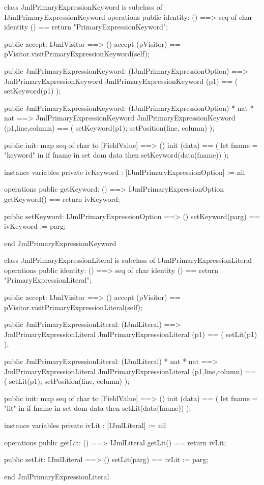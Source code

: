 \begin{vdm_al}
class JmlPrimaryExpressionKeyword is subclass of IJmlPrimaryExpressionKeyword
operations
  public identity: () ==> seq of char
  identity () == return "PrimaryExpressionKeyword";

  public accept: IJmlVisitor ==> ()
  accept (pVisitor) == pVisitor.visitPrimaryExpressionKeyword(self);

  public JmlPrimaryExpressionKeyword:
    (IJmlPrimaryExpressionOption) ==> JmlPrimaryExpressionKeyword
  JmlPrimaryExpressionKeyword (p1) == 
    ( setKeyword(p1) );

  public JmlPrimaryExpressionKeyword:
    (IJmlPrimaryExpressionOption) *
    nat *
    nat ==> JmlPrimaryExpressionKeyword
  JmlPrimaryExpressionKeyword (p1,line,column) == 
    ( setKeyword(p1);
      setPosition(line, column) );

  public init: map seq of char to [FieldValue] ==> ()
  init (data) ==
    ( let fname = "keyword" in
        if fname in set dom data
        then setKeyword(data(fname)) );

instance variables
  private ivKeyword : [IJmlPrimaryExpressionOption] := nil

operations
  public getKeyword: () ==> IJmlPrimaryExpressionOption
  getKeyword() == return ivKeyword;

  public setKeyword: IJmlPrimaryExpressionOption ==> ()
  setKeyword(parg) == ivKeyword := parg;

end JmlPrimaryExpressionKeyword
\end{vdm_al}

\begin{vdm_al}
class JmlPrimaryExpressionLiteral is subclass of IJmlPrimaryExpressionLiteral
operations
  public identity: () ==> seq of char
  identity () == return "PrimaryExpressionLiteral";

  public accept: IJmlVisitor ==> ()
  accept (pVisitor) == pVisitor.visitPrimaryExpressionLiteral(self);

  public JmlPrimaryExpressionLiteral:
    (IJmlLiteral) ==> JmlPrimaryExpressionLiteral
  JmlPrimaryExpressionLiteral (p1) == 
    ( setLit(p1) );

  public JmlPrimaryExpressionLiteral:
    (IJmlLiteral) *
    nat *
    nat ==> JmlPrimaryExpressionLiteral
  JmlPrimaryExpressionLiteral (p1,line,column) == 
    ( setLit(p1);
      setPosition(line, column) );

  public init: map seq of char to [FieldValue] ==> ()
  init (data) ==
    ( let fname = "lit" in
        if fname in set dom data
        then setLit(data(fname)) );

instance variables
  private ivLit : [IJmlLiteral] := nil

operations
  public getLit: () ==> IJmlLiteral
  getLit() == return ivLit;

  public setLit: IJmlLiteral ==> ()
  setLit(parg) == ivLit := parg;

end JmlPrimaryExpressionLiteral
\end{vdm_al}

